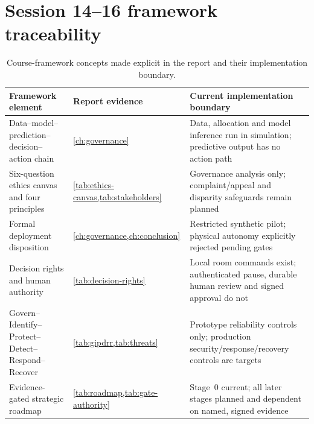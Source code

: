 \section{Session 14--16 framework traceability}
\begin{table}[H]
\centering
\caption{Course-framework concepts made explicit in the report and their implementation boundary.}
\begin{tabularx}{\textwidth}{L{0.20\textwidth}Y Y}
\toprule
Framework element & Report evidence & Current implementation boundary\\
\midrule
Data--model--prediction--decision--action chain & \cref{ch:governance} & Data, allocation and model inference run in simulation; predictive output has no action path\\
Six-question ethics canvas and four principles & \cref{tab:ethics-canvas,tab:stakeholders} & Governance analysis only; complaint/appeal and disparity safeguards remain planned\\
Formal deployment disposition & \cref{ch:governance,ch:conclusion} & Restricted synthetic pilot; physical autonomy explicitly rejected pending gates\\
Decision rights and human authority & \cref{tab:decision-rights} & Local room commands exist; authenticated pause, durable human review and signed approval do not\\
Govern--Identify--Protect--Detect--Respond--Recover & \cref{tab:gipdrr,tab:threats} & Prototype reliability controls only; production security/response/recovery controls are targets\\
Evidence-gated strategic roadmap & \cref{tab:roadmap,tab:gate-authority} & Stage~0 current; all later stages planned and dependent on named, signed evidence\\
\bottomrule
\end{tabularx}
\end{table}
